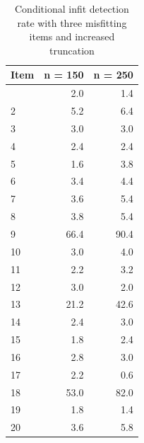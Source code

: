 \documentclass[
  letterpaper,
  DIV=11,
  numbers=noendperiod]{scrartcl}
\begin{document}
\begin{longtable}[]{@{}lrr@{}}

\caption{\label{tbl-ifb3b}Conditional infit detection rate with three
misfitting items and increased truncation}

\tabularnewline

\toprule\noalign{}
Item & n = 150 & n = 250 \\
\midrule\noalign{}
\endhead
\bottomrule\noalign{}
\endlastfoot
1 & 2.0 & 1.4 \\
2 & 5.2 & 6.4 \\
3 & 3.0 & 3.0 \\
4 & 2.4 & 2.4 \\
5 & 1.6 & 3.8 \\
6 & 3.4 & 4.4 \\
7 & 3.6 & 5.4 \\
8 & 3.8 & 5.4 \\
9 & 66.4 & 90.4 \\
10 & 3.0 & 4.0 \\
11 & 2.2 & 3.2 \\
12 & 3.0 & 2.0 \\
13 & 21.2 & 42.6 \\
14 & 2.4 & 3.0 \\
15 & 1.8 & 2.4 \\
16 & 2.8 & 3.0 \\
17 & 2.2 & 0.6 \\
18 & 53.0 & 82.0 \\
19 & 1.8 & 1.4 \\
20 & 3.6 & 5.8 \\

\end{longtable}
\end{document}
